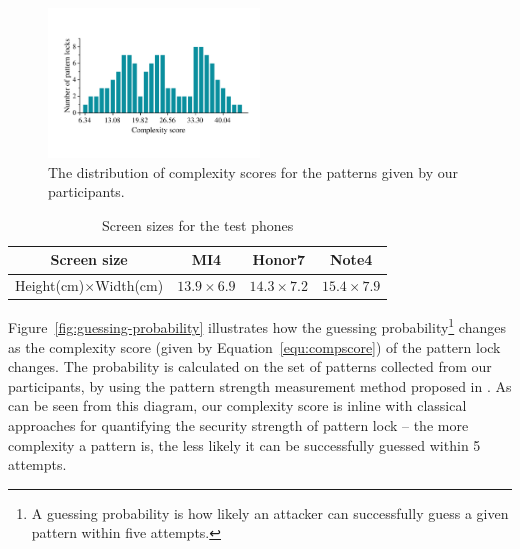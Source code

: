        \begin{figure}[!t]
            \centering
            \includegraphics[width=0.5\textwidth]{fig/pattern-strength.pdf}
            \caption{The distribution of complexity scores for the patterns given by our participants.}
            \label{fig:pattern-strength}
        \end{figure}

    \begin{table}[!t]
            \centering
            \caption{Screen sizes for the test phones}
            \label{tab:locking-screen-size}
            \small
            \begin{tabular}{cccc}
                \toprule
                \textbf{Screen size} & \textbf{MI4} & \textbf{Honor7} & \textbf{Note4} \\
                \midrule
                Height(cm)$\times$Width(cm) & $13.9\times6.9$ & $14.3\times7.2$ & $15.4\times7.9$ \\
                \bottomrule
            \end{tabular}
    \end{table}

    Figure~\ref{fig:guessing-probability} illustrates how the guessing probability\footnote{A guessing probability is
    how likely an attacker can successfully guess a given pattern within five attempts.} changes as the complexity score (given by Equation~\ref{equ:compscore}) of the pattern lock changes.
    The probability is calculated on the set of patterns collected from our participants, by using the pattern strength
    measurement method proposed in \cite{Heidt2016Refining}. As can be seen from this diagram,
    our complexity score is inline with classical approaches for quantifying the security strength of pattern lock -- the more complexity a 
    pattern is, the less likely it can be successfully guessed within 5 attempts. 
    

